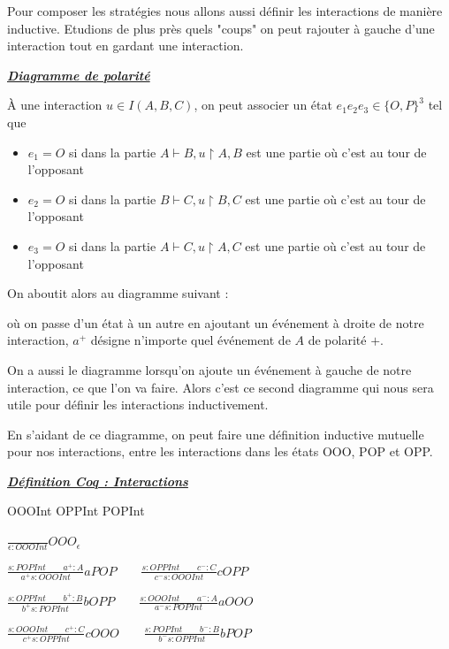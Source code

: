 \documentclass[a4paper,12pt]{article}
\renewenvironment{leftbar}{
  \def\FrameCommand{\vrule width 1pt \hspace{10pt}}
  \MakeFramed {\advance\hsize-\width \FrameRestore}
\setlength{\parskip}{10pt}}
 {\endMakeFramed}
\newenvironment{answer}[1]
{
  \vspace{0.5cm} \noindent \begin{minipage}{\linewidth}
    \textbf{\textit{\uline{#1}}}
    \begin{leftbar}
}
{
    \end{leftbar}\end{minipage}\vspace{0.2cm}
}
\newenvironment{answernopage}[1]
{
  \vspace{0.5cm} \noindent
  \textbf{\textit{\uline{#1}}}
  \begin{leftbar}
}
{
    \end{leftbar}\vspace{0.2cm}
}
\begin{document}
Pour composer les stratégies nous allons aussi définir les interactions
de manière inductive.
Etudions de plus près quels "coups" on peut rajouter à gauche d'une interaction
tout en gardant une interaction.


\begin{answernopage}{Diagramme de polarité}

À une interaction $u \in I(A,B,C)$, on peut associer un état
$e_1 e_2 e_3 \in \{O,P\}^3$ tel que
\begin{itemize}
\item $e_1 = O$ si dans la partie $A\vdash B, u\upharpoonright A,B $ est une partie où c'est au tour de l'opposant
\item $e_2 = O$ si dans la partie $B\vdash C, u\upharpoonright B,C $ est une partie où c'est au tour de l'opposant
\item $e_3 = O$ si dans la partie $A\vdash C, u\upharpoonright A,C $ est une partie où c'est au tour de l'opposant
\end{itemize}

On aboutit alors au diagramme suivant :


où on passe d'un état à un autre en ajoutant un événement à droite de
notre interaction, $a^+$ désigne n'importe quel événement de $A$
de polarité $+$.

On a aussi le diagramme lorsqu'on ajoute un événement à gauche de notre
interaction, ce que l'on va faire. Alors c'est ce second diagramme qui
nous sera utile pour définir les interactions inductivement.



\end{answernopage}

En s'aidant de ce diagramme, on peut faire une définition inductive mutuelle
pour nos interactions, entre les interactions dans les états OOO, POP et OPP.

\begin{answer}{Définition Coq : Interactions \href{https://ulysse_durand.gitlab.io/stagel3/Codecoq.theories.interactions.html\#OOO\_int}{\faCode}}
OOOInt \qquad OPPInt \qquad POPInt


$\frac{}{\epsilon : OOOInt} OOO_{\epsilon}$

$\frac{s : POPInt \qquad a^+ : A}{a^+ s : OOOInt} aPOP \qquad
 \frac{s : OPPInt \qquad c^- : C}{c^- s : OOOInt} cOPP$

$\frac{s : OPPInt \qquad b^+ : B}{b^+ s : POPInt} bOPP \qquad
 \frac{s : OOOInt \qquad a^- : A}{a^- s : POPInt} aOOO$

$\frac{s : OOOInt \qquad c^+ : C}{c^+ s : OPPInt} cOOO \qquad
 \frac{s : POPInt \qquad b^- : B}{b^- s : OPPInt} bPOP$
\end{answer}
\end{document}
